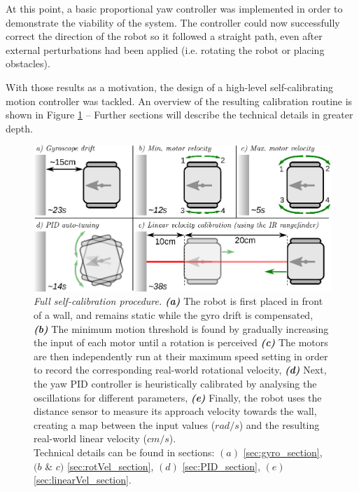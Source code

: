 \documentclass[12pt,twoside]{report}
\begin{document}
At this point, a basic proportional yaw controller was implemented in order to demonstrate the viability of the system. The controller could now successfully correct the direction of the robot so it followed a straight path, even after external perturbations had been applied (i.e. rotating the robot or placing obstacles).

With those results as a motivation, the design of a high-level self-calibrating motion controller was tackled. An overview of the resulting calibration routine is shown in Figure \ref{fig:full_calibration_procedure} -- Further sections will describe the technical details in greater depth.



\begin{figure}[hbtp]
\centerline{\includegraphics[width=1\linewidth]{full_calibration_procedure}}
\caption[Full self-calibration procedure]{\emph{Full self-calibration procedure.} \textbf{\textit{(a)}} The robot is first placed in front of a wall, and remains static while the gyro drift is compensated, \textbf{\textit{(b)}} The minimum motion threshold is found by gradually increasing the input of each motor until a rotation is perceived \textbf{\textit{(c)}} The motors are then independently run at their maximum speed setting in order to record the corresponding real-world rotational velocity, \textbf{\textit{(d)}} Next, the yaw PID controller is heuristically calibrated by analysing the oscillations for different parameters, \textbf{\textit{(e)}} Finally, the robot uses the distance sensor to measure its approach velocity towards the wall, creating a map between the input values ($rad/s$) and the resulting real-world linear velocity ($cm/s$).\\
Technical details can be found in sections: $(a)$ \ref{sec:gyro_section}, $(b$ \& $c)$ \ref{sec:rotVel_section}, $(d)$ \ref{sec:PID_section}, $(e)$ \ref{sec:linearVel_section}.
}
\label{fig:full_calibration_procedure}
\end{figure}
\end{document}

